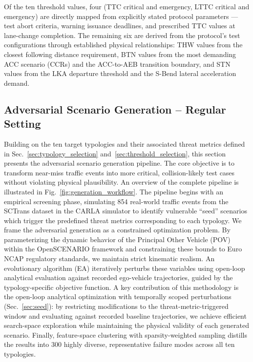Of the ten threshold values, four (TTC critical and emergency, LTTC critical and emergency) are directly mapped from explicitly stated protocol parameters --- test abort criteria, warning issuance deadlines, and prescribed TTC values at lane-change completion. The remaining six are derived from the protocol's test configurations through established physical relationships: THW values from the closest following distance requirement, BTN values from the most demanding ACC scenario (CCRs) and the ACC-to-AEB transition boundary, and STN values from the LKA departure threshold and the S-Bend lateral acceleration demand.

\subsection{Adversarial Scenario Generation -- Regular Setting}\label{sec:generation}
Building on the ten target typologies and their associated threat metrics defined in Sec.~\ref{sec:typology_selection} and~\ref{sec:threshold_selection}, this section presents the adversarial scenario generation pipeline. The core objective is to transform near-miss traffic events into more critical, collision-likely test cases without violating physical plausibility. An overview of the complete pipeline is illustrated in Fig.~\ref{fig:generation_workflow}. The pipeline begins with an empirical screening phase, simulating 854 real-world traffic events from the SCTrans dataset in the CARLA simulator to identify vulnerable ``seed'' scenarios which trigger the predefined threat metrics corresponding to each typology. We frame the adversarial generation as a constrained optimization problem. By parameterizing the dynamic behavior of the Principal Other Vehicle (POV) within the OpenSCENARIO framework and constraining these bounds to Euro NCAP regulatory standards, we maintain strict kinematic realism. An evolutionary algorithm (EA) iteratively perturbs these variables using open-loop analytical evaluation against recorded ego-vehicle trajectories, guided by the typology-specific objective function. A key contribution of this methodology is the open-loop analytical optimization with temporally scoped perturbations (Sec.~\ref{sec:seed}): by restricting modifications to the threat-metric-triggered window and evaluating against recorded baseline trajectories, we achieve efficient search-space exploration while maintaining the physical validity of each generated scenario. Finally, feature-space clustering with sparsity-weighted sampling distills the results into 300 highly diverse, representative failure modes across all ten typologies.

